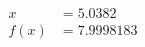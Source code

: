 \documentclass[preview]{standalone}
\begin{document}
\begin{align*}
x &= 5.0382\\f(x) &= 7.9998183
\end{align*}
\end{document}
